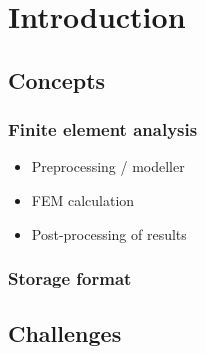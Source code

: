 \chapter{Introduction}
\label{chapter-introduction}



\section{Concepts} %


\subsection{Finite element analysis}
\begin{itemize}
    \item Preprocessing / modeller
    \item FEM calculation
    \item Post-processing of results
\end{itemize}

\subsection{Storage format}




\section{Challenges}



